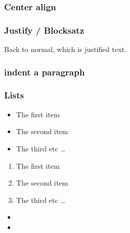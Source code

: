 \subsubsection{Center align}
\begin{center}
\lipsum[1]
\end{center}

\subsubsection{Justify / Blocksatz}
Back to normal, which is justified text. 
\lipsum[1]

\subsubsection{indent a paragraph}

\lipsum[1]

\begin{adjustwidth}{2cm}{}
\lipsum[1]
\end{adjustwidth}

\begin{adjustwidth}{4cm}{}
\lipsum[1]
\end{adjustwidth}

\begin{adjustwidth}{2cm}{}
\lipsum[1]
\end{adjustwidth}

\lipsum[1]

\subsubsection{Lists}

\begin{itemize}  
\item The first item 
\item The second item 
\item The third etc \ldots 
\end{itemize}

\begin{enumerate}  
\item The first item 
\item The second item 
\item The third etc \ldots 
\end{enumerate}

\begin{itemize}
\item \blindtext
\item \blindtext
\end{itemize}

